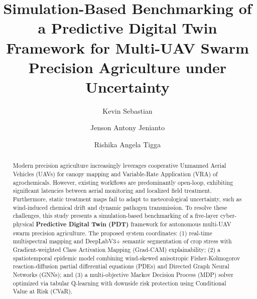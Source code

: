 \documentclass[review,3p,times,authoryear]{elsarticle}
\begin{document}
\begin{frontmatter}

\title{Simulation-Based Benchmarking of a Predictive Digital Twin Framework for Multi-UAV Swarm Precision Agriculture under Uncertainty}

\author[1]{Kevin Sebastian}

\author[1]{Jenson Antony Jenianto}

\author[1]{Rishika Angela Tigga}



\begin{abstract}
Modern precision agriculture increasingly leverages cooperative Unmanned Aerial Vehicles (UAVs) for canopy mapping and Variable-Rate Application (VRA) of agrochemicals. However, existing workflows are predominantly open-loop, exhibiting significant latencies between aerial monitoring and localized field treatment. Furthermore, static treatment maps fail to adapt to meteorological uncertainty, such as wind-induced chemical drift and dynamic pathogen transmission. To resolve these challenges, this study presents a simulation-based benchmarking of a five-layer cyber-physical \textbf{Predictive Digital Twin (PDT)} framework for autonomous multi-UAV swarm precision agriculture. The proposed system coordinates: (1) real-time multispectral mapping and DeepLabV3+ semantic segmentation of crop stress with Gradient-weighted Class Activation Mapping (Grad-CAM) explainability; (2) a spatiotemporal epidemic model combining wind-skewed anisotropic Fisher-Kolmogorov reaction-diffusion partial differential equations (PDEs) and Directed Graph Neural Networks (GNNs); and (3) a multi-objective Markov Decision Process (MDP) solver optimized via tabular Q-learning with downside risk protection using Conditional Value at Risk (CVaR).


\end{abstract}
\end{frontmatter}
\end{document}
